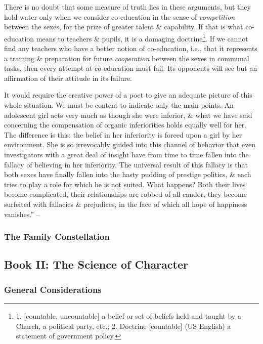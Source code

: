\documentclass{article}
\begin{document}
There is no doubt that some measure of truth lies in these arguments, but they hold water only when we consider co-education in the sense of {\it competition} between the sexes, for the prize of greater talent \& capability. If that is what co-education means to teachers \& pupils, it is a damaging doctrine\footnote{1. [countable, uncountable] a belief or set of beliefs held and taught by a Church, a political party, etc.; 2. Doctrine [countable] (US English) a statement of government policy.}. If we cannot find any teachers who have a better notion of co-education, i.e., that it represents a training \& preparation for future {\it cooperation} between the sexes in communal tasks, then every attempt at co-education must fail. Its opponents will see but an affirmation of their attitude in its failure.

It would require the creative power of a poet to give an adequate picture of this whole situation. We must be content to indicate only the main points. An adolescent girl acts very much as though she were inferior, \& what we have said concerning the compensation of organic inferiorities holds equally well for her. The difference is this: the belief in her inferiority is forced upon a girl by her environment. She is so irrevocably guided into this channel of behavior that even investigators with a great deal of insight have from time to time fallen into the fallacy of believing in her inferiority. The universal result of this fallacy is that both sexes have finally fallen into the hasty pudding of prestige politics, \& each tries to play a role for which he is not suited. What happens? Both their lives become complicated, their relationships are robbed of all candor, they become surfeited with fallacies \& prejudices, in the face of which all hope of happiness vanishes.'' -- \cite[pp. 147--148]{Adler_human_nature}

\subsubsection{The Family Constellation}

\subsection{Book II: The Science of Character}

\subsubsection{General Considerations}
\end{document}
